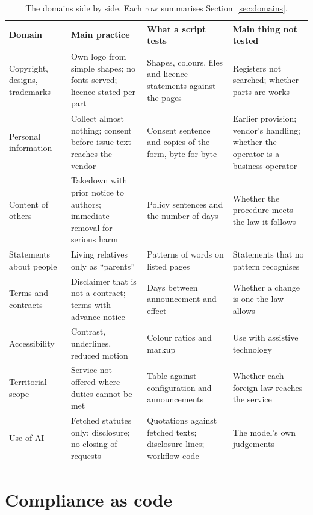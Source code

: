 \documentclass[11pt]{article}
\begin{document}
\begin{table}[h]
\centering
\small
\begin{tabular}{>{\raggedright\arraybackslash}p{}>{\raggedright\arraybackslash}p{}>{\raggedright\arraybackslash}p{}>{\raggedright\arraybackslash}p{}}
\toprule
Domain & Main practice & What a script tests & Main thing not tested \\
\midrule
Copyright, designs, trademarks & Own logo from simple shapes; no fonts served; licence stated per part & Shapes, colours, files and licence statements against the pages & Registers not searched; whether parts are works \\
Personal information & Collect almost nothing; consent before issue text reaches the vendor & Consent sentence and copies of the form, byte for byte & Earlier provision; vendor's handling; whether the operator is a business operator \\
Content of others & Takedown with prior notice to authors; immediate removal for serious harm & Policy sentences and the number of days & Whether the procedure meets the law it follows \\
Statements about people & Living relatives only as ``parents'' & Patterns of words on listed pages & Statements that no pattern recognises \\
Terms and contracts & Disclaimer that is not a contract; terms with advance notice & Days between announcement and effect & Whether a change is one the law allows \\
Accessibility & Contrast, underlines, reduced motion & Colour ratios and markup & Use with assistive technology \\
Territorial scope & Service not offered where duties cannot be met & Table against configuration and announcements & Whether each foreign law reaches the service \\
Use of AI & Fetched statutes only; disclosure; no closing of requests & Quotations against fetched texts; disclosure lines; workflow code & The model's own judgements \\
\bottomrule
\end{tabular}
\caption{The domains side by side. Each row summarises Section~\ref{sec:domains}.}\label{tab:domains}
\end{table}

\section{Compliance as code}\label{sec:cac}
\end{document}
